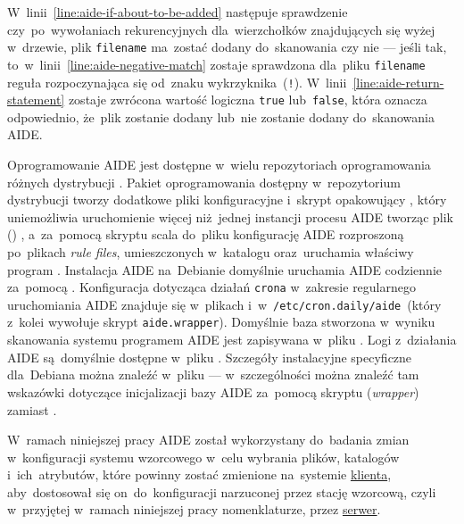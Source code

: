 \documentclass[thesis]{subfiles}
\begin{document}
W~linii~\ref{line:aide-if-about-to-be-added} następuje sprawdzenie czy~po~wywołaniach rekurencyjnych dla~wierzchołków znajdujących się wyżej w~drzewie, plik \texttt{filename} ma~zostać dodany do~skanowania czy nie --- jeśli tak, to~w~linii~\ref{line:aide-negative-match} zostaje sprawdzona dla~pliku \texttt{filename} reguła rozpoczynająca się od~znaku wykrzyknika~(\texttt{!}). W~linii~\ref{line:aide-return-statement} zostaje zwrócona wartość logiczna \texttt{true} lub~\texttt{false}, która oznacza odpowiednio, że~plik zostanie dodany lub~nie zostanie dodany do~skanowania AIDE.

Oprogramowanie AIDE jest dostępne w~wielu repozytoriach oprogramowania różnych dystrybucji . Pakiet oprogramowania dostępny w~repozytorium dystrybucji \debian{} tworzy dodatkowe pliki konfiguracyjne i~skrypt opakowujący , który uniemożliwia uruchomienie więcej niż~jednej instancji procesu AIDE tworząc plik () , a~za~pomocą skryptu  scala do~pliku  konfigurację AIDE rozproszoną po~plikach \emph{rule files}, umieszczonych w~katalogu  oraz~uruchamia właściwy program . Instalacja AIDE na~Debianie domyślnie uruchamia AIDE codziennie za~pomocą . Konfiguracja dotycząca działań \texttt{crona} w~zakresie regularnego uruchomiania AIDE znajduje się w~plikach  i~w~\texttt{/etc/cron.daily/aide}~(który z~kolei wywołuje skrypt \texttt{aide.wrapper}). Domyślnie baza stworzona w~wyniku skanowania systemu programem AIDE jest zapisywana w~pliku . Logi z~działania AIDE są~domyślnie dostępne w~pliku . Szczegóły instalacyjne specyficzne dla~Debiana można znaleźć w~pliku  --- w~szczególności można znaleźć tam wskazówki dotyczące inicjalizacji bazy AIDE za~pomocą skryptu  (\emph{wrapper}) zamiast .

W~ramach niniejszej pracy AIDE został wykorzystany do~badania zmian w~konfiguracji systemu wzorcowego w~celu wybrania plików, katalogów i~ich~atrybutów, które powinny zostać zmienione na~systemie \hyperref[sec:cli-app]{klienta}, aby~dostosował się on~do~konfiguracji narzuconej przez stację wzorcową, czyli w~przyjętej w~ramach niniejszej pracy nomenklaturze, przez \hyperref[sec:srv-app]{serwer}.
\end{document}
